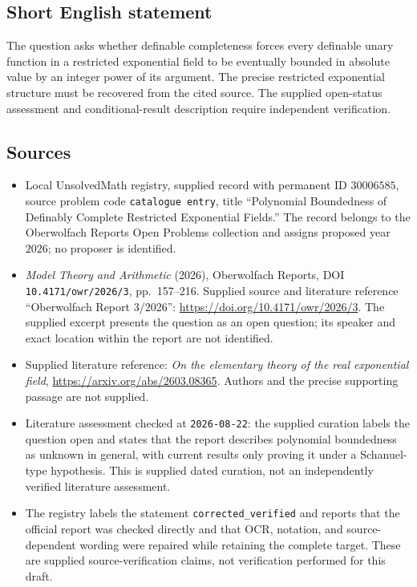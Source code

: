 \documentclass[11pt]{article}
\begin{document}
\subsection{Short English statement}
The question asks whether definable completeness forces every definable unary function in a restricted exponential field to be eventually bounded in absolute value by an integer power of its argument. The precise restricted exponential structure must be recovered from the cited source. The supplied open-status assessment and conditional-result description require independent verification.
\subsection{Sources}
\begin{itemize}
\item Local UnsolvedMath registry, supplied record with permanent ID \(30006585\), source problem code \texttt{catalogue entry}, title ``Polynomial Boundedness of Definably Complete Restricted Exponential Fields.'' The record belongs to the Oberwolfach Reports Open Problems collection and assigns proposed year \(2026\); no proposer is identified.
\item \emph{Model Theory and Arithmetic} (2026), Oberwolfach Reports, DOI \texttt{10.4171/owr/2026/3}, pp.\ 157--216. Supplied source and literature reference ``Oberwolfach Report 3/2026'': \url{https://doi.org/10.4171/owr/2026/3}. The supplied excerpt presents the question as an open question; its speaker and exact location within the report are not identified.
\item Supplied literature reference: \emph{On the elementary theory of the real exponential field}, \url{https://arxiv.org/abs/2603.08365}. Authors and the precise supporting passage are not supplied.
\item Literature assessment checked at \texttt{2026-08-22}: the supplied curation labels the question open and states that the report describes polynomial boundedness as unknown in general, with current results only proving it under a Schanuel-type hypothesis. This is supplied dated curation, not an independently verified literature assessment.
\item The registry labels the statement \texttt{corrected\_verified} and reports that the official report was checked directly and that OCR, notation, and source-dependent wording were repaired while retaining the complete target. These are supplied source-verification claims, not verification performed for this draft.
\end{itemize}
\end{document}
